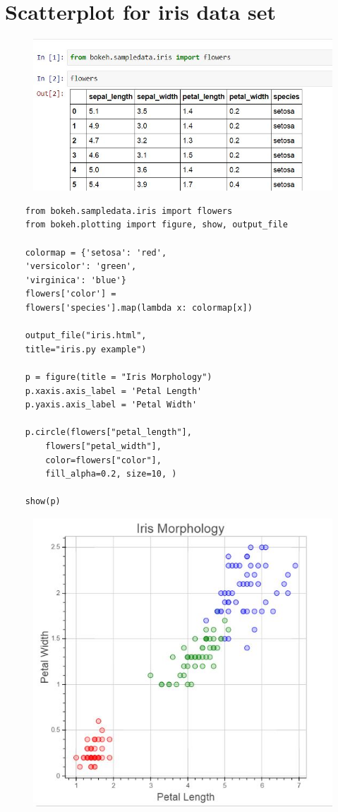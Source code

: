 \documentclass[12pt, a4paper]{report}
\begin{document}
\section*{Scatterplot for iris data set}
\begin{figure}[h!]
	\centering
	\includegraphics[width=0.8\linewidth]{images/iris-head}
\end{figure}
\begin{framed}
	\begin{verbatim}
	from bokeh.sampledata.iris import flowers
	from bokeh.plotting import figure, show, output_file
	
	colormap = {'setosa': 'red', 
	'versicolor': 'green', 
	'virginica': 'blue'}
	flowers['color'] = 
	flowers['species'].map(lambda x: colormap[x])
	
	output_file("iris.html", 
	title="iris.py example")
	
	p = figure(title = "Iris Morphology")
	p.xaxis.axis_label = 'Petal Length'
	p.yaxis.axis_label = 'Petal Width'
	
	p.circle(flowers["petal_length"],
    	flowers["petal_width"],
	    color=flowers["color"], 
	    fill_alpha=0.2, size=10, )
	
	show(p)
	\end{verbatim}
\end{framed}
\newpage
\begin{figure}[h!]
	\centering
	\includegraphics[width=0.6\linewidth]{images/02-iris-scatterplot1-petal}
	
\end{figure}
\end{document}
